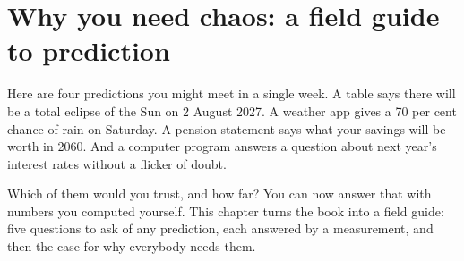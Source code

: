 
\chapter{Why you need chaos: a field guide to prediction}
\label{ch:why}

\noindent
Here are four predictions you might meet in a single week. A table says
there will be a total eclipse of the Sun on 2 August 2027. A weather app
gives a 70 per cent chance of rain on Saturday. A pension statement says
what your savings will be worth in 2060. And a computer program answers a
question about next year's interest rates without a flicker of doubt.

Which of them would you trust, and how far? You can now answer that with
numbers you computed yourself. This chapter turns the book into a field
guide: five questions to ask of any prediction, each answered by a
measurement, and then the case for why everybody needs them.

\begin{outcomes}
\end{outcomes}


